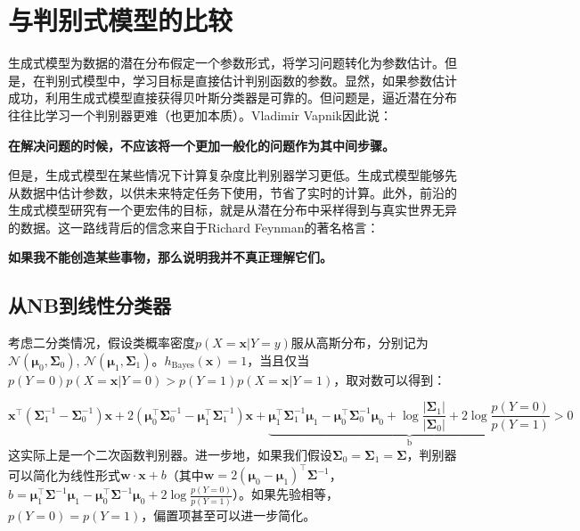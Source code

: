 \documentclass{article}
\begin{document}
\section{与判别式模型的比较}
	\label{sec:final}
	生成式模型为数据的潜在分布假定一个参数形式，将学习问题转化为参数估计。但是，在判别式模型中，学习目标是直接估计判别函数的参数。显然，如果参数估计成功，利用生成式模型直接获得贝叶斯分类器是可靠的。但问题是，逼近潜在分布往往比学习一个判别器更难（也更加本质）。Vladimir Vapnik因此说：
	\begin{center}
	\textbf{在解决问题的时候，不应该将一个更加一般化的问题作为其中间步骤。}
	\end{center}

	但是，生成式模型在某些情况下计算复杂度比判别器学习更低。生成式模型能够先从数据中估计参数，以供未来特定任务下使用，节省了实时的计算。此外，前沿的生成式模型研究有一个更宏伟的目标，就是从潜在分布中采样得到与真实世界无异的数据。这一路线背后的信念来自于Richard Feynman的著名格言：	
	\begin{center}
	\textbf{如果我不能创造某些事物，那么说明我并不真正理解它们。}
	\end{center}

	\subsection{从NB到线性分类器}
	考虑二分类情况，假设类概率密度$p(X=\bm{x}|Y=y)$服从高斯分布，分别记为$\mathcal{N}(\bm{\mu}_0,\bm{\Sigma}_0)$, $\mathcal{N}(\bm{\mu}_1,\bm{\Sigma}_1)$。$h_{\mathrm{Bayes}}(\bm{x})=1$，当且仅当$p(Y=0) p(X=\bm{x}|Y=0)>p(Y=1) p(X=\bm{x}|Y=1)$，取对数可以得到：
	
	\begin{equation*}
	\bm{x}^\top ( \bm{\Sigma}_1^{-1} - \bm{\Sigma}_0^{-1}) \bm{x} + 2 (\bm{\mu}_0^\top\bm{\Sigma}_0^{-1} - \bm{\mu}_1^\top\bm{\Sigma}_1^{-1}) \bm{x} + \underbrace{\bm{\mu}_1^\top\bm{\Sigma}_1^{-1}\bm{\mu}_1 - \bm{\mu}_0^\top\bm{\Sigma}_0^{-1}\bm{\mu}_0 + \log\frac{|\bm{\Sigma}_1|}{|\bm{\Sigma}_0|} + 2\log \frac{p(Y=0)}{p(Y=1)}}_{\mathrm{b}} > 0
	\end{equation*}
这实际上是一个二次函数判别器。进一步地，如果我们假设$\bm{\Sigma}_0=\bm{\Sigma}_1=\bm{\Sigma}$，判别器可以简化为线性形式$\bm{w}\cdot\bm{x}+b$（其中$\bm{w}=2(\bm{\mu}_0 - \bm{\mu}_1)^\top\bm{\Sigma}^{-1}$，$b=\bm{\mu}_1^\top\bm{\Sigma}^{-1}\bm{\mu}_1 - \bm{\mu}_0^\top\bm{\Sigma}^{-1}\bm{\mu}_0+ 2\log \frac{p(Y=0)}{p(Y=1)}$）。如果先验相等，$p(Y=0)=p(Y=1)$，偏置项甚至可以进一步简化。
	
\end{document}
